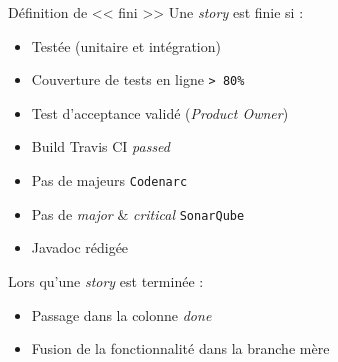 \begin{frame}{Définition de << fini >>}
	Une \textit{story} est finie si : 
	\vspace{-10px}
	\begin{itemize}
		\item Testée (unitaire et intégration)
		\item Couverture de tests en ligne \texttt{> 80\%}
		\item Test d'acceptance validé (\textit{Product Owner})
		\item Build Travis CI \textit{passed}
		\item Pas de majeurs \texttt{Codenarc}
		\item Pas de \textit{major} \& \textit{critical} \texttt{SonarQube}
		\item Javadoc rédigée
	\end{itemize}
	\vfill
	\pause
	Lors qu'une \textit{story} est terminée : 
	\vspace{-10px}
	\begin{itemize}
		\item Passage dans la colonne \textit{done}
		\item Fusion de la fonctionnalité dans la branche mère
	\end{itemize}





\end{frame}